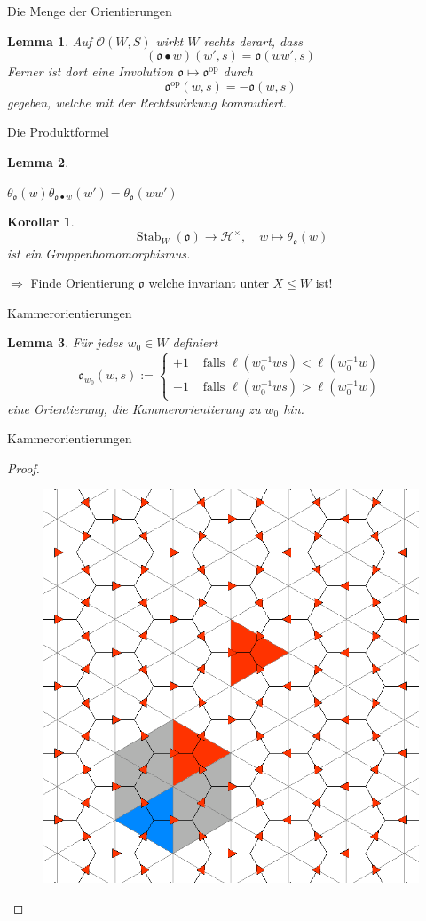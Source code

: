\documentclass[pdf]{beamer}
\newcommand{\op}[1]{\operatorname{#1}}
\newtheorem*{cor*}{Korollar}
\newtheorem*{lemma*}{Lemma}
\begin{document}
\begin{frame}{Die Menge der Orientierungen}
   \begin{lemma*}
      Auf $\mathcal{O}(W,S)$ wirkt $W$ rechts derart, dass
      \[ (\mathfrak{o}\bullet w)(w',s) = \mathfrak{o}(ww',s) \]
      \pause[2]Ferner ist dort eine Involution $\mathfrak{o} \mapsto \mathfrak{o}^{\op{op}}$ durch
      \[ \mathfrak{o}^{\op{op}}(w,s) = -\mathfrak{o}(w,s) \]
      gegeben, welche mit der Rechtswirkung kommutiert.
   \end{lemma*}
\end{frame}

\begin{frame}{Die Produktformel}
   \begin{lemma*}
      \begin{center}$\theta_{\mathfrak{o}}(w) \theta_{\mathfrak{o}\bullet w}(w') = \theta_{\mathfrak{o}}(ww')$\end{center}
   \end{lemma*}
   \pause[2] 
   \begin{cor*}
      \[ \op{Stab}_W(\mathfrak{o}) \longrightarrow \mathcal{H}^\times,\quad w \mapsto \theta_\mathfrak{o}(w) \]
      ist ein Gruppenhomomorphismus.
   \end{cor*}
   \pause[3]$\Rightarrow$ Finde Orientierung $\mathfrak{o}$ welche invariant unter $X \leq W$ ist!
\end{frame}

\begin{frame}{Kammerorientierungen}
   \pause[2]\begin{lemma*}
      Für jedes $w_0 \in W$ definiert
      \[ \mathfrak{o}_{w_0}(w,s) := \begin{cases} +1 &\text{ falls $\ell(w_0^{-1}ws) < \ell(w_0^{-1}w)$} \\
         -1 &\text{ falls $\ell(w_0^{-1}ws) > \ell(w_0^{-1}w)$} \end{cases} \]
      eine Orientierung, die \textit{Kammerorientierung zu $w_0$ hin}.
   \end{lemma*}
\end{frame}

\begin{frame}{Kammerorientierungen}
   \begin{proof}
      \begin{figure}
         \centering%
         \includegraphics[width=.5\textwidth]{graphics/orientations-and-cayley-graph.eps}%
      \end{figure}
   \end{proof}
\end{frame}
\end{document}
